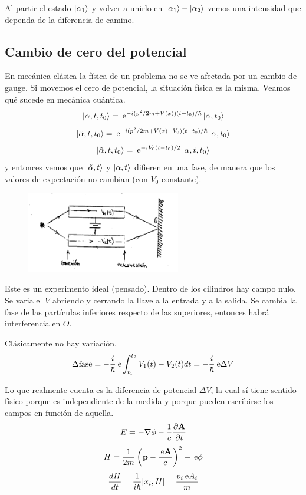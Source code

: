 \documentclass[10pt,oneside]{CBFT_book}
\begin{document}
Al partir el estado $\Ket{\alpha_1} $ y volver a unirlo en $\Ket{\alpha_1} + \Ket{\alpha_2}$ vemos una 
intensidad que 
dependa de la diferencia de camino.

\subsection{Cambio de cero del potencial}

En mecánica clásica la física de un problema no se ve afectada por un cambio de gauge.
Si movemos el cero de potencial, la situación física es la misma.
Veamos qué sucede en mecánica cuántica.
\[
	\Ket{\alpha,t,t_0} = \:\mathrm{e}^{ -i (p^2/2m + V(x))(t-t_0)/\hbar} \Ket{\alpha,t_0}
\]
\[
	\Ket{\tilde{\alpha},t,t_0} = \:\mathrm{e}^{ -i (p^2/2m + V(x) + V_0)(t-t_0)/\hbar} \Ket{\alpha,t_0}
\]
\[
	\Ket{\tilde{\alpha},t,t_0} = \:\mathrm{e}^{ -i V_0(t-t_0)/2 }\Ket{\alpha,t,t_0}
\]
y entonces vemos que $\Ket{\tilde{\alpha},t}$ y $\Ket{\alpha,t}$ difieren en una fase, de manera que los 
valores de 
expectación no cambian (con $V_0$ constante).

\begin{figure}[htb]
	\begin{center}
	\includegraphics[width=0.6\textwidth]{images/teo2_7.pdf}	 
	\end{center}
	\caption{}
\end{figure} 

Este es un experimento ideal (pensado). Dentro de los cilindros hay campo nulo. Se varia el $V$ abriendo y 
cerrando la 
llave a la entrada y a la salida.
Se cambia la fase de las partículas inferiores respecto de las superiores, entonces habrá interferencia en 
$O$.

Clásicamente no hay variación,
\[
	\Delta \text{fase} = -\frac{i}{\hbar}\:\mathrm{e} \int _{t_1}^{t_2} V_1(t) - V_2(t) dt = 
	-\frac{i}{\hbar}\:\mathrm{e} \Delta V
\]

Lo que realmente cuenta es la diferencia de potencial $\Delta V$, la cual sí tiene sentido físico porque es 
independiente de la medida y porque pueden escribirse los campos en función de aquella.
\[
	E = - \Nabla\phi - \frac{1}{c}\dpar{\vb{A}}{t}
\]
\[
	H = \frac{1}{2m} \left( \vb{p} - \frac{\euler\vb{A}}{c}\right)^2 + \euler\phi 
\]
\[
	\frac{d^{\hspace{-0.05em}} {H}}{d {t}^{\hspace{-0.05em}}} = \frac{1}{i\hbar}[x_i,H] = \frac{p_i  \:\mathrm{e} A_i}{m}
\]
\end{document}
